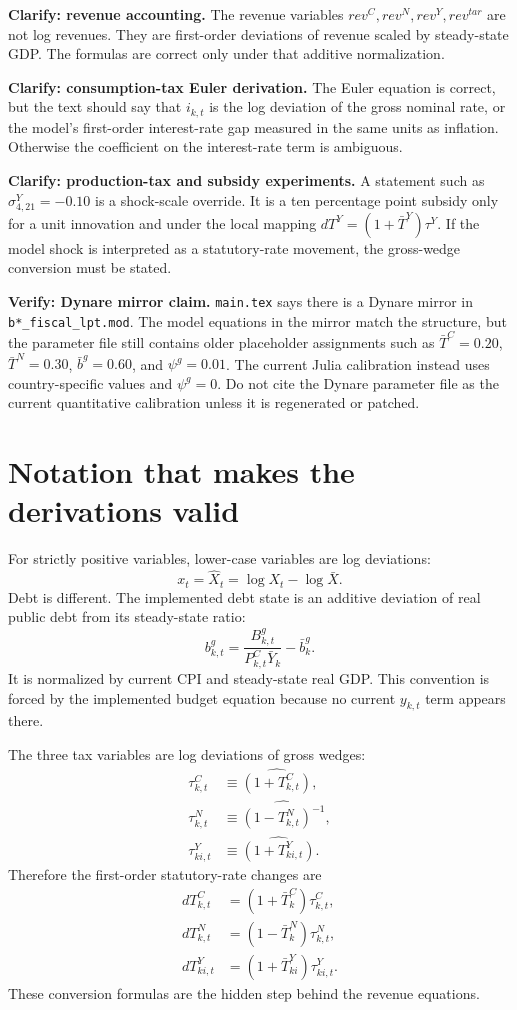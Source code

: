 \documentclass[11pt]{article}
\newcommand{\TC}{T^C}
\newcommand{\TN}{T^N}
\newcommand{\TY}{T^Y}
\newcommand{\tauc}{\tau^C}
\newcommand{\taun}{\tau^N}
\newcommand{\tauy}{\tau^Y}
\newcommand{\bg}{b^g}
\newcommand{\Pc}{P^C}
\begin{document}
\textbf{Clarify: revenue accounting.}
The revenue variables \(rev^C,rev^N,rev^Y,rev^{tar}\) are not log revenues.
They are first-order deviations of revenue scaled by steady-state GDP. The
formulas are correct only under that additive normalization.

\textbf{Clarify: consumption-tax Euler derivation.}
The Euler equation is correct, but the text should say that \(i_{k,t}\) is the
log deviation of the gross nominal rate, or the model's first-order interest-rate
gap measured in the same units as inflation. Otherwise the coefficient on the
interest-rate term is ambiguous.

\textbf{Clarify: production-tax and subsidy experiments.}
A statement such as \(\sigma^Y_{4,21}=-0.10\) is a shock-scale override. It is a
ten percentage point subsidy only for a unit innovation and under the local
mapping \(d\TY=(1+\bar \TY)\tauy\). If the model shock is interpreted as a
statutory-rate movement, the gross-wedge conversion must be stated.

\textbf{Verify: Dynare mirror claim.}
\texttt{main.tex} says there is a Dynare mirror in \texttt{b*\_fiscal\_lpt.mod}.
The model equations in the mirror match the structure, but the parameter file
still contains older placeholder assignments such as \(\bar \TC=0.20\),
\(\bar \TN=0.30\), \(\bar b^g=0.60\), and \(\psi^g=0.01\). The current Julia
calibration instead uses country-specific values and \(\psi^g=0\). Do not cite
the Dynare parameter file as the current quantitative calibration unless it is
regenerated or patched.

\section{Notation that makes the derivations valid}

For strictly positive variables, lower-case variables are log deviations:
\[
  x_t=\widehat X_t=\log X_t-\log \bar X.
\]
Debt is different. The implemented debt state is an additive deviation of real
public debt from its steady-state ratio:
\[
  \bg_{k,t}
  =
  \frac{B^g_{k,t}}{\Pc_{k,t}\bar Y_k}-\bar b^g_k.
\]
It is normalized by current CPI and steady-state real GDP. This convention is
forced by the implemented budget equation because no current \(y_{k,t}\) term
appears there.

The three tax variables are log deviations of gross wedges:
\begin{align}
  \tauc_{k,t} &\equiv \widehat{(1+\TC_{k,t})}, \\
  \taun_{k,t} &\equiv \widehat{(1-\TN_{k,t})^{-1}}, \\
  \tauy_{k i,t} &\equiv \widehat{(1+\TY_{k i,t})}.
\end{align}
Therefore the first-order statutory-rate changes are
\begin{align}
  d\TC_{k,t} &= (1+\bar\TC_k)\tauc_{k,t}, \\
  d\TN_{k,t} &= (1-\bar\TN_k)\taun_{k,t}, \\
  d\TY_{k i,t} &= (1+\bar\TY_{k i})\tauy_{k i,t}.
\end{align}
These conversion formulas are the hidden step behind the revenue equations.
\end{document}
